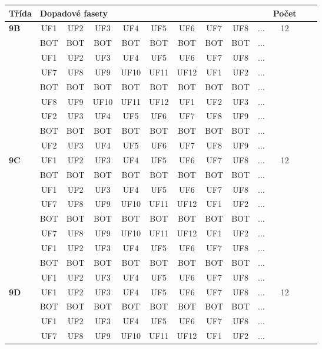 \begin{table}[h!]
\centering
\begin{tabular}{|l|c|c|c|c|c|c|c|c|c|c|c|c|}
\hline
Třída &  \multicolumn{9}{l}{Dopadové fasety} \vline  & Počet\\
\hline \hline
\textbf{9B} & UF1 & UF2 & UF3 & UF4 & UF5 & UF6 & UF7 & UF8 & $\dots$ & 12\\
 & BOT & BOT & BOT & BOT & BOT & BOT & BOT & BOT & $\dots$ & \\
 & UF1 & UF2 & UF3 & UF4 & UF5 & UF6 & UF7 & UF8 & $\dots$ & \\
 & UF7 & UF8 & UF9 & UF10 & UF11 & UF12 & UF1 & UF2 & $\dots$ & \\
 & BOT & BOT & BOT & BOT & BOT & BOT & BOT & BOT & $\dots$ & \\
 & UF8 & UF9 & UF10 & UF11 & UF12 & UF1 & UF2 & UF3 & $\dots$ & \\
 & UF2 & UF3 & UF4 & UF5 & UF6 & UF7 & UF8 & UF9 & $\dots$ & \\
 & BOT & BOT & BOT & BOT & BOT & BOT & BOT & BOT & $\dots$ & \\
 & UF2 & UF3 & UF4 & UF5 & UF6 & UF7 & UF8 & UF9 & $\dots$ & \\
\hline \hline
\textbf{9C} & UF1 & UF2 & UF3 & UF4 & UF5 & UF6 & UF7 & UF8 & $\dots$ & 12\\
 & BOT & BOT & BOT & BOT & BOT & BOT & BOT & BOT & $\dots$ & \\
 & UF1 & UF2 & UF3 & UF4 & UF5 & UF6 & UF7 & UF8 & $\dots$ & \\
 & UF7 & UF8 & UF9 & UF10 & UF11 & UF12 & UF1 & UF2 & $\dots$ & \\
 & BOT & BOT & BOT & BOT & BOT & BOT & BOT & BOT & $\dots$ & \\
 & UF7 & UF8 & UF9 & UF10 & UF11 & UF12 & UF1 & UF2 & $\dots$ & \\
 & UF1 & UF2 & UF3 & UF4 & UF5 & UF6 & UF7 & UF8 & $\dots$ & \\
 & BOT & BOT & BOT & BOT & BOT & BOT & BOT & BOT & $\dots$ & \\
 & UF1 & UF2 & UF3 & UF4 & UF5 & UF6 & UF7 & UF8 & $\dots$ & \\
\hline \hline
\textbf{9D} & UF1 & UF2 & UF3 & UF4 & UF5 & UF6 & UF7 & UF8 & $\dots$ & 12\\
 & BOT & BOT & BOT & BOT & BOT & BOT & BOT & BOT & $\dots$ & \\
 & UF1 & UF2 & UF3 & UF4 & UF5 & UF6 & UF7 & UF8 & $\dots$ & \\
 & UF7 & UF8 & UF9 & UF10 & UF11 & UF12 & UF1 & UF2 & $\dots$ & \\

\end{tabular}
\end{table}

